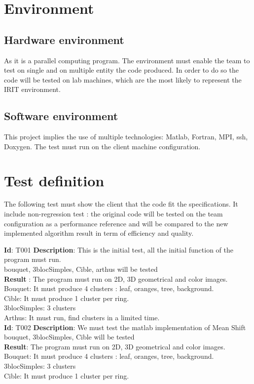 
\section{Environment}
\subsection{Hardware environment}
As it is a parallel computing program. The environment must enable the team to test on single and on multiple entity the code produced. In order to do so the code will be tested on lab machines, which are the most likely to represent the IRIT environment. 
\subsection{Software environment}
This project implies the use of multiple technologies: Matlab, Fortran, MPI, ssh, Doxygen. The test must run on the client machine configuration.

\section{Test definition}
The following test must show the client that the code fit the specifications. It include non-regression test : the original code will be tested on the team configuration as a performance reference and will be compared to the new implemented algorithm result in term of efficiency and quality.

\textbf{Id}: T001
\textbf{Description}: This is the initial test, all the initial function of the program must run. \\
bouquet, 3blocSimples, Cible, arthus will be tested\\
\textbf{Result} : The program must run on 2D, 3D geometrical and color images. \\
Bouquet: It must produce 4 clusters : leaf, oranges, tree, background.\\
Cible: It must produce 1 cluster per ring.\\
3blocSimples: 3 clusters\\
Arthus: It must run, find clusters in a limited time.\\

\textbf{Id}: T002
\textbf{Description}: We must test the matlab implementation of Mean Shift \\
bouquet, 3blocSimples, Cible will be tested\\
\textbf{Result}: The program must run on 2D, 3D geometrical and color images. \\
Bouquet: It must produce 4 clusters : leaf, oranges, tree, background.\\
3blocSimples: 3 clusters\\
Cible: It must produce 1 cluster per ring.\\

